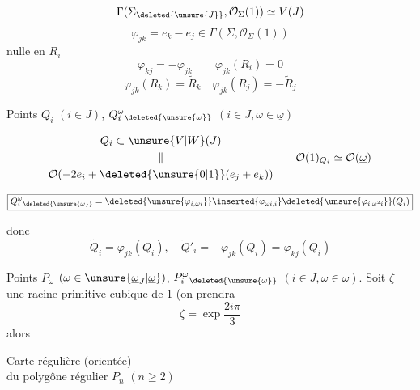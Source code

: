 \[
\Gamma(\Sigma_{\deleted{\unsure{J}}},\mathcal{O}_\Sigma(1))\simeq V(J)
\]
\[
\varphi_{jk}=e_k-e_j\in\Gamma(\Sigma,\mathcal{O}_\Sigma(1))
\]
nulle en $R_i$
\[
\varphi_{kj}=-\varphi_{jk}\qquad\varphi_{jk}(R_i)=0
\]
\[
\boxed{\varphi_{jk}(R_k)=\widetilde{R}_k\quad\varphi_{jk}(R_j)=-\widetilde{R}_j}
\]

Points $Q_i$ $(i\in J)$, $Q_i^\omega{}_{\deleted{\unsure{\omega}}}$ $(i\in J,\omega\in\underline{\omega})$

\[
\begin{gathered}
Q_i\subset\unsure{V|W}(J)\\
\Vert\\
\mathcal{O}(-2e_i+\deleted{\unsure{0|1}}(e_j+e_k))
\end{gathered}
\qquad\mathcal{O}(1)_{Q_i}\simeq\mathcal{O}(\underline{\omega})
\]




\[
\boxed{Q_i^\omega{}_{\deleted{\unsure{\omega}}}=
\deleted{\unsure{\varphi_{i,\omega i}}}\inserted{\varphi_{\omega i,i}}
\deleted{\unsure{\varphi_{i,\omega^2i}}}(Q_i)}
\]


donc
\[
\widetilde{Q}_i=\varphi_{jk}(Q_i),\quad
\widetilde{Q}'_i=-\varphi_{jk}(Q_i)=\varphi_{kj}(Q_i)
\]

Points $P_\omega$ $(\omega\in\unsure{\underline{\omega}_J|\underline{\omega}})$,
$P_i^\omega{}_{\deleted{\unsure{\omega}}}$ $(i\in J,\omega\in\omega)$.
Soit $\zeta$ une  racine primitive cubique de $1$ (on prendra
\[
\zeta=\exp\frac{2i\pi}{3}
\]
alors



Carte régulière (orientée)\\
du polygône régulier $P_n$ $(n\geq2)$

